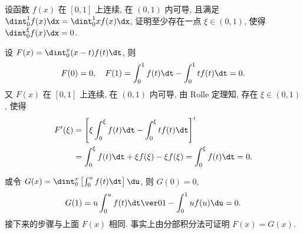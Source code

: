 \documentclass{ctexart}
\begin{document}
\begin{exercise}
    设函数 $f(x)$ 在 $[0,1]$ 上连续, 在 $(0,1)$ 内可导, 且满足 $\dint_0^1f(x)\dx=\dint_0^1xf(x)\dx$, 证明至少存在一点 $\xi\in(0,1)$, 使得 $\dint_0^\xi f(x)\dx=0$.
\end{exercise}

\begin{solution}
    设 $F(x)=\dint_0^x(x-t)f(t)\dt$, 则 \[
        F(0)=0,\quad F(1)=\int_0^1f(t)\dt-\int_0^1tf(t)\dt=0.
    \] 又 $F(x)$ 在 $[0,1]$ 上连续, 在 $(0,1)$ 内可导, 由 Rolle 定理知, 存在 $\xi\in(0,1)$, 使得 \[\begin{aligned}
        F'(\xi)&=\left[\xi\int_0^\xi f(t)\dt-\int_0^\xi tf(t)\dt\right]'\\
        &=\int_0^\xi f(t)\dt+\xi f(\xi)-\xi f(\xi)=\int_0^\xi f(t)\dt=0.
    \end{aligned}\]

    或令 $G(x)=\dint_0^x\left[\int_0^uf(t)\dt\right]\du$, 则 $G(0)=0$, \[
        G(1)=u\int_0^uf(t)\dt\ver01-\int_0^1uf(u)\du=0.
    \] 接下来的步骤与上面 $F(x)$ 相同. 事实上由分部积分法可证明 $F(x)=G(x)$.
\end{solution}
\end{document}
